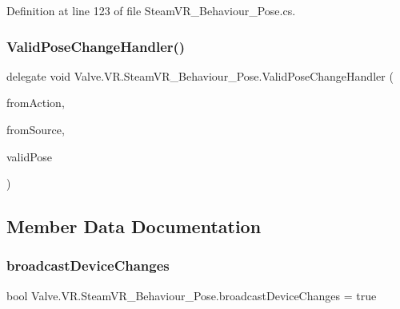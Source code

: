 Definition at line 123 of file Steam\+V\+R\+\_\+\+Behaviour\+\_\+\+Pose.\+cs.

\mbox{\label{class_valve_1_1_v_r_1_1_steam_v_r___behaviour___pose_abe1b44cd414dbcb2eff3ce7b0ea7fb94}} 
\subsubsection{\texorpdfstring{ValidPoseChangeHandler()}{ValidPoseChangeHandler()}}
{\footnotesize\ttfamily delegate void Valve.\+V\+R.\+Steam\+V\+R\+\_\+\+Behaviour\+\_\+\+Pose.\+Valid\+Pose\+Change\+Handler (\begin{DoxyParamCaption}\item[{\mbox{\hyperlink{class_valve_1_1_v_r_1_1_steam_v_r___behaviour___pose}{Steam\+V\+R\+\_\+\+Behaviour\+\_\+\+Pose}}}]{from\+Action,  }\item[{\mbox{\hyperlink{namespace_valve_1_1_v_r_a82e5bf501cc3aa155444ee3f0662853f}{Steam\+V\+R\+\_\+\+Input\+\_\+\+Sources}}}]{from\+Source,  }\item[{bool}]{valid\+Pose }\end{DoxyParamCaption})}



\subsection{Member Data Documentation}
\mbox{\label{class_valve_1_1_v_r_1_1_steam_v_r___behaviour___pose_a0569eb1ab4a75608b24ffe1adb2c0e03}} 
\subsubsection{\texorpdfstring{broadcastDeviceChanges}{broadcastDeviceChanges}}
{\footnotesize\ttfamily bool Valve.\+V\+R.\+Steam\+V\+R\+\_\+\+Behaviour\+\_\+\+Pose.\+broadcast\+Device\+Changes = true}



